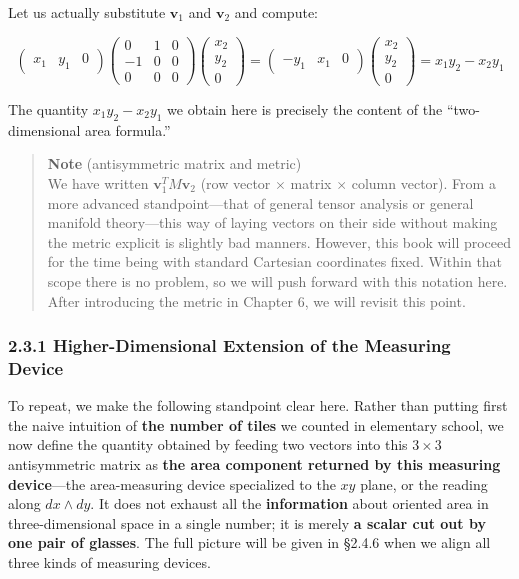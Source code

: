\documentclass[a4paper,12pt,openany]{book}
\begin{document}
Let us actually substitute \(\mathbf{v}_1\) and \(\mathbf{v}_2\) and
compute:

\[
\begin{pmatrix} x_1 & y_1 & 0 \end{pmatrix}
\begin{pmatrix}
  0 & 1 & 0 \\
  -1 & 0 & 0 \\
  0 & 0 & 0
\end{pmatrix}
\begin{pmatrix} x_2 \\ y_2 \\ 0 \end{pmatrix}
= \begin{pmatrix} -y_1 & x_1 & 0 \end{pmatrix}
\begin{pmatrix} x_2 \\ y_2 \\ 0 \end{pmatrix}
= x_1 y_2 - x_2 y_1
\]

The quantity \(x_1 y_2 - x_2 y_1\) we obtain here is precisely the
content of the ``two-dimensional area formula.''

\begin{quote}
\textbf{Note} (antisymmetric matrix and metric)\\
We have written \(\mathbf{v}_1^T M \mathbf{v}_2\) (row vector \(\times\)
matrix \(\times\) column vector). From a more advanced standpoint—that
of general tensor analysis or general manifold theory—this way of
laying vectors on their side without making the metric explicit is
slightly bad manners. However, this book will proceed for the time being
with standard Cartesian coordinates fixed. Within that scope there is no
problem, so we will push forward with this notation here. After
introducing the metric in Chapter 6, we will revisit this point.
\end{quote}

\hypertarget{higher-dimensional-extension-of-the-measuring-device}{%
\subsubsection{2.3.1 Higher-Dimensional Extension of the Measuring
Device}\label{higher-dimensional-extension-of-the-measuring-device}}

To repeat, we make the following standpoint clear here. Rather than
putting first the naive intuition of \textbf{the number of tiles} we
counted in elementary school, we now define the quantity obtained by
feeding two vectors into this \(3 \times 3\) antisymmetric matrix as
\textbf{the area component returned by this measuring device}—the
area-measuring device specialized to the \(xy\) plane, or the reading
along \(dx \wedge dy\). It does not exhaust all the \textbf{information}
about oriented area in three-dimensional space in a single number; it is
merely \textbf{a scalar cut out by one pair of glasses}. The full
picture will be given in §2.4.6 when we align all three kinds of
measuring devices.
\end{document}
